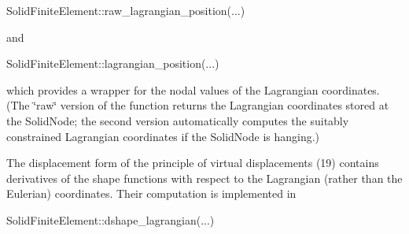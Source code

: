 \begin{DoxyItemize}
\begin{DoxyCode}
SolidFiniteElement::raw\_lagrangian\_position(...)
\end{DoxyCode}
 and 
\begin{DoxyCode}
SolidFiniteElement::lagrangian\_position(...)
\end{DoxyCode}
 which provides a wrapper for the nodal values of the Lagrangian coordinates. (The \char`\"{}raw\char`\"{} version of the function returns the Lagrangian coordinates stored at the {\ttfamily Solid\+Node}; the second version automatically computes the suitably constrained Lagrangian coordinates if the {\ttfamily Solid\+Node} is hanging.)
\item The displacement form of the principle of virtual displacements (19) contains derivatives of the shape functions with respect to the Lagrangian (rather than the Eulerian) coordinates. Their computation is implemented in 
\begin{DoxyCode}
SolidFiniteElement::dshape\_lagrangian(...)
\end{DoxyCode}


\end{DoxyItemize}
